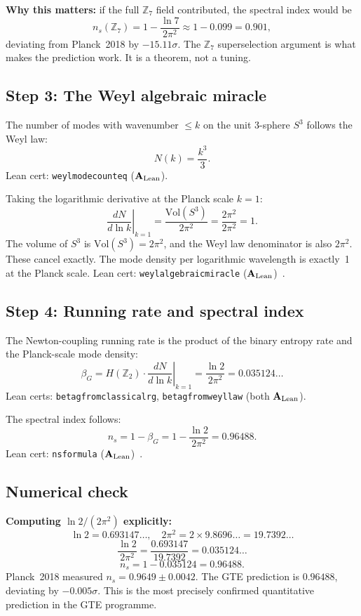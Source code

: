 \documentclass[11pt,a4paper]{article}
\newcommand{\lean}[1]{%
  \penalty-100
  \begingroup\def\_{\textunderscore\allowbreak}\texttt{#1}\endgroup}
\newcommand{\CatAL}{\ensuremath{\mathbf{A}_{\rm Lean}}}
\newcommand{\ns}{n_s}
\begin{document}
\textbf{Why this matters:}
if the full $\mathbb{Z}_7$ field contributed, the spectral index would be
\[
  \ns(\mathbb{Z}_7) = 1 - \frac{\ln 7}{2\pi^2} \approx 1 - 0.099 = 0.901,
\]
deviating from Planck~2018 by $-15.11\sigma$.
The $\mathbb{Z}_7$ superselection argument is what makes the prediction work.
It is a theorem, not a tuning.

\subsection{Step 3: The Weyl algebraic miracle}

The number of modes with wavenumber $\leq k$ on the unit 3-sphere $S^3$
follows the Weyl law:
\[
  N(k) = \frac{k^3}{3}.
\]
Lean cert: \lean{weyl\_mode\_count\_eq} (\CatAL).

Taking the logarithmic derivative at the Planck scale $k = 1$:
\[
  \left.\frac{dN}{d\ln k}\right|_{k=1}
  = \frac{\mathrm{Vol}(S^3)}{2\pi^2}
  = \frac{2\pi^2}{2\pi^2} = 1.
\]
The volume of $S^3$ is $\mathrm{Vol}(S^3) = 2\pi^2$, and the Weyl law
denominator is also $2\pi^2$.
These cancel exactly.
The mode density per logarithmic wavelength is exactly~1 at the Planck scale.
Lean cert: \lean{weyl\_algebraic\_miracle} (\CatAL)~\cite{SpivackGTECompleteFramework}.

\subsection{Step 4: Running rate and spectral index}

The Newton-coupling running rate is the product of the binary entropy rate
and the Planck-scale mode density:
\[
  \beta_G = H(\mathbb{Z}_2) \cdot \left.\frac{dN}{d\ln k}\right|_{k=1}
  = \frac{\ln 2}{2\pi^2} = 0.035124\ldots
\]
Lean certs: \lean{beta\_g\_from\_classical\_rg}, \lean{beta\_g\_from\_weyl\_law}
(both \CatAL).

The spectral index follows:
\begin{equation}
  \ns = 1 - \beta_G = 1 - \frac{\ln 2}{2\pi^2} = 0.96488.
  \label{eq:ns}
\end{equation}
Lean cert: \lean{n\_s\_formula} (\CatAL)~\cite{SpivackGTECosmology}.

\subsection{Numerical check}

\textbf{Computing $\ln 2 / (2\pi^2)$ explicitly:}
\[
  \ln 2 = 0.693147\ldots, \quad 2\pi^2 = 2 \times 9.8696\ldots = 19.7392\ldots
\]
\[
  \frac{\ln 2}{2\pi^2} = \frac{0.693147}{19.7392} = 0.035124\ldots
\]
\[
  \ns = 1 - 0.035124 = 0.96488.
\]
Planck~2018 measured $\ns = 0.9649 \pm 0.0042$.
The GTE prediction is $0.96488$, deviating by $-0.005\sigma$.
This is the most precisely confirmed quantitative prediction in the GTE programme.
\end{document}
